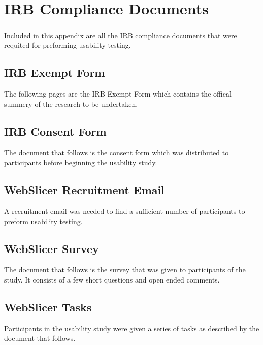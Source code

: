 \chapter{IRB Compliance Documents}
\paragraph{}
Included in this appendix are all the IRB compliance documents that were requited for preforming usability testing.

\section{IRB Exempt Form}
The following pages are the IRB Exempt Form which contains the offical summery of the research to be undertaken.


\section{IRB Consent Form}
The document that follows is the consent form which was distributed to participants before beginning the usability study.


\section{WebSlicer Recruitment Email}
A recruitment email was needed to find a sufficient number of participants to preform usability testing.


\section{WebSlicer Survey}
The document that follows is the survey that was given to participants of the study. It consists of a few short questions and open ended comments.


\section{WebSlicer Tasks}
Participants in the usability study were given a series of tasks as described by the document that follows.


